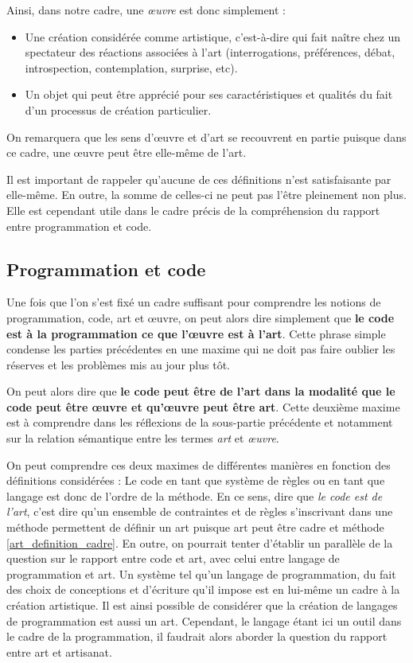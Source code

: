 \documentclass[12pt]{article} %
\begin{document}
Ainsi, dans notre cadre, une \textit{œuvre} est donc simplement :
\begin{itemize}
    \item Une création considérée comme artistique, c'est-à-dire qui fait naître chez un spectateur des réactions associées à l'art (interrogations, préférences, débat, introspection, contemplation, surprise, etc).
    \item Un objet qui peut être apprécié pour ses caractéristiques et qualités du fait d'un processus de création particulier.
\end{itemize}
On remarquera que les sens d'œuvre et d'art se recouvrent en partie puisque dans ce cadre, une œuvre peut être elle-même de l'art.

Il est important de rappeler qu'aucune de ces définitions n'est satisfaisante par elle-même. En outre, la somme de celles-ci ne peut pas l'être pleinement non plus. Elle est cependant utile dans le cadre précis de la compréhension du rapport entre programmation et code.

\subsection{Programmation et code} %
Une fois que l'on s'est fixé un cadre suffisant pour comprendre les notions de programmation, code, art et œuvre, on peut alors dire simplement que \textbf{le code est à la programmation ce que l'œuvre est à l'art}. Cette phrase simple condense les parties précédentes en une maxime qui ne doit pas faire oublier les réserves et les problèmes mis au jour plus tôt.

On peut alors dire que \textbf{le code peut être de l'art dans la modalité que le code peut être œuvre et qu'œuvre peut être art}. Cette deuxième maxime est à comprendre dans les réflexions de la sous-partie précédente et notamment sur la relation sémantique entre les termes \textit{art} et \textit{œuvre}.

On peut comprendre ces deux maximes de différentes manières en fonction des définitions considérées : Le code en tant que système de règles ou en tant que langage est donc de l'ordre de la méthode. En ce sens, dire que \textit{le code est de l'art}, c'est dire qu'un ensemble de contraintes et de règles s'inscrivant dans une méthode permettent de définir un art puisque art peut être cadre et méthode \ref{art_definition_cadre}. En outre, on pourrait tenter d'établir un parallèle de la question sur le rapport entre code et art, avec celui entre langage de programmation et art. Un système tel qu'un langage de programmation, du fait des choix de conceptions et d'écriture qu'il impose est en lui-même un cadre à la création artistique. Il est ainsi possible de considérer que la création de langages de programmation est aussi un art. Cependant, le langage étant ici un outil dans le cadre de la programmation, il faudrait alors aborder la question du rapport entre art et artisanat. 
\end{document}
